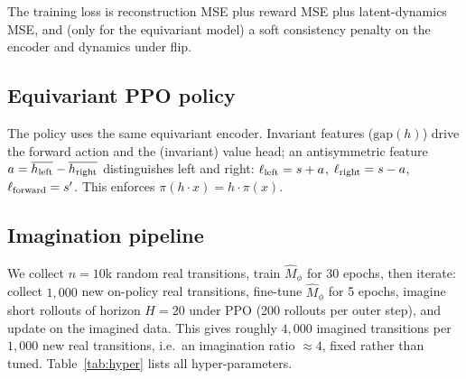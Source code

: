 \documentclass[preprint,12pt]{elsarticle}
\begin{document}
The training loss is reconstruction MSE plus reward MSE plus latent-dynamics
MSE, and (only for the equivariant model) a soft consistency penalty on the
encoder and dynamics under flip.

\subsection{Equivariant PPO policy}
The policy uses the same equivariant encoder. Invariant features
($\mathrm{gap}(h)$) drive the forward action and the (invariant) value head;
an antisymmetric feature $a=\overline{h_{\rm left}}-\overline{h_{\rm right}}$
distinguishes left and right:
$\ell_{\rm left}=s+a$, $\ell_{\rm right}=s-a$, $\ell_{\rm forward}=s'$.
This enforces $\pi(h\cdot x)=h\cdot\pi(x)$.

\subsection{Imagination pipeline}
We collect $n=10$k random real transitions, train $\hat M_\phi$ for 30
epochs, then iterate: collect $1{,}000$ new on-policy real transitions,
fine-tune $\hat M_\phi$ for 5 epochs, imagine short rollouts of horizon
$H=20$ under PPO \cite{ppo2017} (200 rollouts per outer step), and update on
the imagined data. This gives roughly $4{,}000$ imagined transitions per
$1{,}000$ new real transitions, i.e.\ an imagination ratio $\approx4$, fixed
rather than tuned. Table~\ref{tab:hyper} lists all hyper-parameters.
\end{document}
